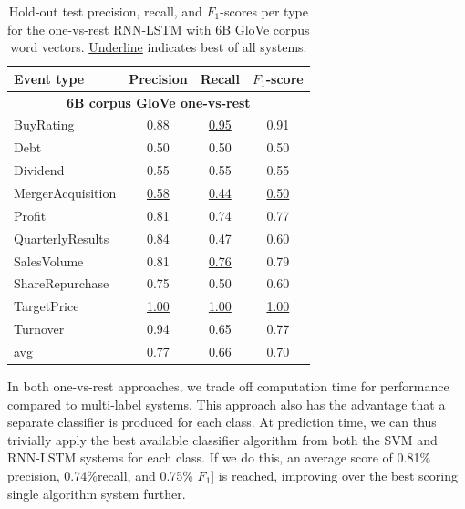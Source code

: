 \documentclass[11pt,a4paper]{article}
\begin{document}
\begin{table}[!htb]
	\centering
	\small{
		\begin{tabular}{p{2.8cm} c c c} 
			\textbf{Event type} & \textbf{Precision} & \textbf{Recall}  & \textbf{$F_1$-score} \\ 
			\hline
			\multicolumn{4}{c}{\textbf{6B corpus GloVe one-vs-rest} } \\
			\hline
			BuyRating           & 0.88               & \underline{0.95} & 0.91                 \\
			Debt                & 0.50               & 0.50             & 0.50                 \\
			Dividend            & 0.55               & 0.55             & 0.55                 \\
			MergerAcquisition   & \underline{0.58}   & \underline{0.44} & \underline{0.50}     \\
			Profit              & 0.81               & 0.74             & 0.77                 \\
			QuarterlyResults    & 0.84               & 0.47             & 0.60                 \\
			SalesVolume         & 0.81               & \underline{0.76} & 0.79                 \\
			ShareRepurchase     & 0.75               & 0.50             & 0.60                 \\
			TargetPrice         & \underline{1.00}   & \underline{1.00} & \underline{1.00}     \\
			Turnover            & 0.94               & 0.65             & 0.77                 \\
			\hdashline
			avg                 & 0.77               & 0.66             & 0.70                 \\
		\end{tabular}
		\caption{Hold-out test precision, recall, and $F_1$-scores per type for the one-vs-rest RNN-LSTM with 6B GloVe corpus word vectors. \underline{Underline} indicates best of all systems.}
		\label{tab:rnnlstmonevsrest}
	}
\end{table}

In both one-vs-rest approaches, we trade off computation time for performance compared to multi-label systems.
This approach also has the advantage that a separate classifier is produced for each class.
At prediction time, we can thus trivially apply the best available classifier algorithm from both the SVM and RNN-LSTM systems for each class.
If we do this, an average score of 0.81\% precision, 0.74\%recall, and 0.75\% $F_1$] is reached, improving over the best scoring single algorithm system further.
\end{document}
